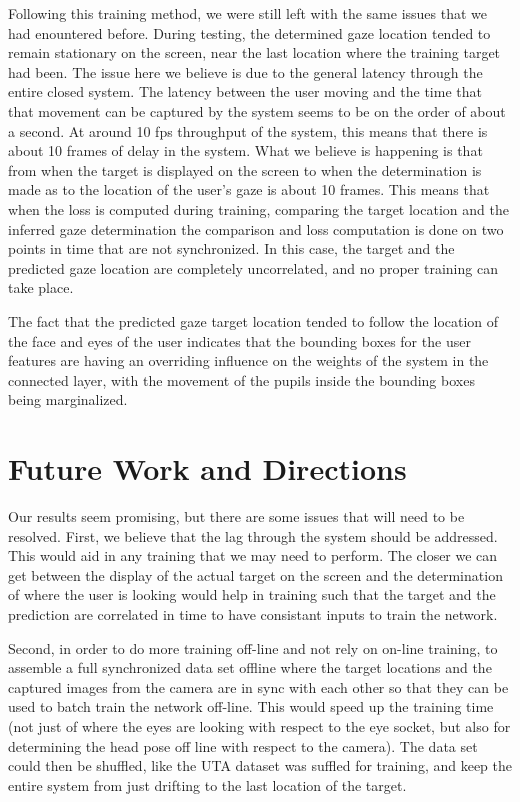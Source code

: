 \documentclass[10pt,twocolumn,letterpaper]{article}
\begin{document}
Following this training method, we were still left with the same
issues that we had enountered before. During testing, the determined
gaze location tended to remain stationary on the screen, near the last
location where the training target had been. The issue here we believe
is due to the general latency through the entire closed system. The
latency between the user moving and the time that that movement can be
captured by the system seems to be on the order of about a
second. At around 10 fps throughput of the system, this means that
there is about 10 frames of delay in the system. What we believe is
happening is that from when the target is displayed on the screen to
when the determination is made as to the location of the user's gaze
is about 10 frames. This means that when the loss is computed during
training, comparing the target location and the inferred gaze
determination the comparison and loss computation is done on two
points in time that are not synchronized. In this case, the target and
the predicted gaze location are completely uncorrelated, and no proper
training can take place.

The fact that the predicted gaze target location tended to follow the
location of the face and eyes of the user indicates that the bounding
boxes for the user features are having an overriding influence on the
weights of the system in the connected layer, with the movement of the
pupils inside the bounding boxes being marginalized.

\section{Future Work and Directions}
Our results seem promising, but there are some issues that will need
to be resolved. First, we believe that the lag through the system
should be addressed. This would aid in any training that we may need
to perform. The closer we can get between the display of the actual
target on the screen and the determination of where the user is
looking would help in training such that the target and the prediction
are correlated in time to have consistant inputs to train the
network.

Second, in order to do more training off-line and not rely on on-line
training, to assemble a full synchronized data set offline where the
target locations and the captured images from the camera are in sync
with each other so that they can be used to batch train the network
off-line. This would speed up the training time (not just of where the
eyes are looking with respect to the eye socket, but also for
determining the head pose off line with respect to the camera). The
data set could then be shuffled, like the UTA dataset was suffled for
training, and keep the entire system from just drifting to the last
location of the target.
\end{document}
